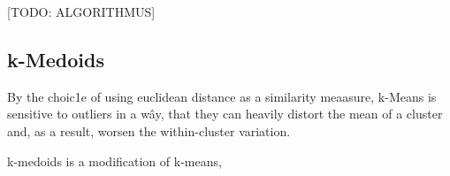 \documentclass[11pt]{article}
\begin{document}
[TODO: ALGORITHMUS]

\subsection{k-Medoids}

By the choic1e of using euclidean distance as a similarity meaasure, k-Means is sensitive to outliers in a wây, that they can heavily distort the mean of a cluster and, as a result, worsen the within-cluster variation.

k-medoids is a modification of k-means, 
\end{document}
